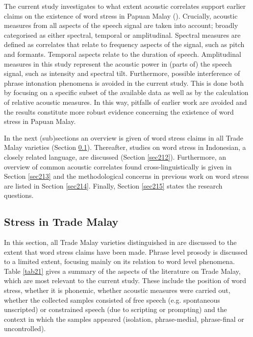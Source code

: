 The current study investigates to what extent acoustic correlates support earlier claims on the existence of word stress in Papuan Malay (\citealt{kluge_grammar_2017}). Crucially, acoustic measures from all aspects of the speech signal are taken into account; broadly categorised as either spectral, temporal or amplitudinal. Spectral measures are defined as correlates that relate to frequency aspects of the signal, such as pitch and formants. Temporal aspects relate to the duration of speech. Amplitudinal measures in this study represent the acoustic power in (parts of) the speech signal, such as intensity and spectral tilt. Furthermore, possible interference of phrase intonation phenomena is avoided in the current study. This is done both by focusing on a specific subset of the available data as well as by the calculation of relative acoustic measures. In this way, pitfalls of earlier work are avoided and the results constitute more robust evidence concerning the existence of word stress in Papuan Malay. \par

In the next (sub)sections an overview is given of word stress claims in all Trade Malay varieties (Section \ref{sec211}). Thereafter, studies on word stress in Indonesian, a closely related language, are discussed (Section \ref{sec212}). Furthermore, an overview of common acoustic correlates found cross-linguistically is given in Section \ref{sec213} and the methodological concerns in previous work on word stress are listed in Section \ref{sec214}. Finally, Section \ref{sec215} states the research questions.

\subsection{Stress in Trade Malay} \label{sec211}
In this section, all Trade Malay varieties distinguished in \citet{paauw_malay_2009} are discussed to the extent that word stress claims have been made. Phrase level prosody is discussed to a limited extent, focusing mainly on its relation to word level phenomena. Table \ref{tab21} gives a summary of the aspects of the literature on Trade Malay, which are most relevant to the current study. These include the position of word stress, whether it is phonemic, whether acoustic measures were carried out, whether the collected samples consisted of free speech (e.g. spontaneous unscripted) or constrained speech (due to scripting or prompting) and the context in which the samples appeared (isolation, phrase-medial, phrase-final or uncontrolled).


